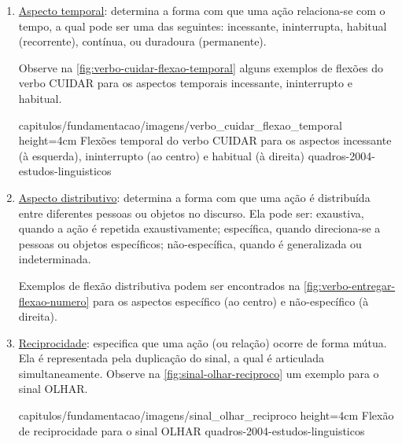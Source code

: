 \begin{enumerate}
\begin{enumerate}
              \item \underline{Aspecto temporal}: determina a forma com que uma ação relaciona-se com o tempo, a qual pode ser uma das seguintes: incessante, ininterrupta, habitual (recorrente), contínua, ou duradoura (permanente).

                    Observe na \autoref{fig:verbo-cuidar-flexao-temporal} alguns exemplos de flexões do verbo CUIDAR para os aspectos temporais incessante, ininterrupto e habitual.

                    {capitulos/fundamentacao/imagens/verbo_cuidar_flexao_temporal} %
                    {height=4cm} %
                    {Flexões temporal do verbo CUIDAR para os aspectos incessante (à esquerda), ininterrupto (ao centro) e habitual (à direita)} %
                    {quadros-2004-estudos-linguisticos} %


              \item \underline{Aspecto distributivo}: determina a forma com que uma ação é distribuída entre diferentes pessoas ou objetos no discurso.
                    Ela pode ser: exaustiva, quando a ação é repetida exaustivamente; específica, quando direciona-se a pessoas ou objetos específicos; não-específica, quando é generalizada ou indeterminada.

                    Exemplos de flexão distributiva podem ser encontrados na \autoref{fig:verbo-entregar-flexao-numero} para os aspectos específico (ao centro) e não-específico (à direita).


              \item \underline{Reciprocidade}: especifica que uma ação (ou relação) ocorre de forma mútua. Ela é representada pela duplicação do sinal, a qual é articulada simultaneamente.
                    Observe na \autoref{fig:sinal-olhar-reciproco} um exemplo para o sinal OLHAR.

                    {capitulos/fundamentacao/imagens/sinal_olhar_reciproco} %
                    {height=4cm} %
                    {Flexão de reciprocidade para o sinal OLHAR} %
                    {quadros-2004-estudos-linguisticos} %

          \end{enumerate}

\end{enumerate}


